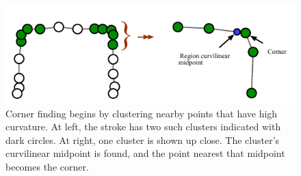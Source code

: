 \begin{figure}[h]
  \centering
  \includegraphics[width=0.8\linewidth]{img/clusters-curvature.pdf}
  \caption[Curvature Clusters and Corners]{Corner finding begins by
    clustering nearby points that have high curvature. At left, the
    stroke has two such clusters indicated with dark circles. At
    right, one cluster is shown up close. The cluster's curvilinear
    midpoint is found, and the point nearest that midpoint becomes the
    corner.}
  \label{fig:corner-finding}
\end{figure}
